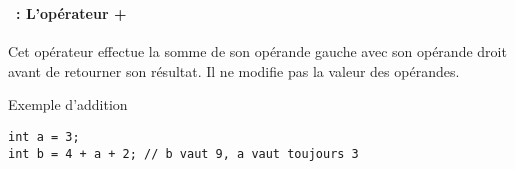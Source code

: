 \begin{frame}[containsverbatim]
  \frametitle{\secname}
  \framesubtitle{\subsecname~: L'opérateur +} 

  Cet opérateur effectue la somme de son opérande gauche avec son opérande droit avant de retourner son résultat. Il ne modifie pas la valeur
  des opérandes.
  \vspace{0.5cm}
  \begin{exampleblock}{Exemple d'addition}
    \begin{verbatim}
int a = 3;
int b = 4 + a + 2; // b vaut 9, a vaut toujours 3\end{verbatim}
  \end{exampleblock}
\end{frame}

